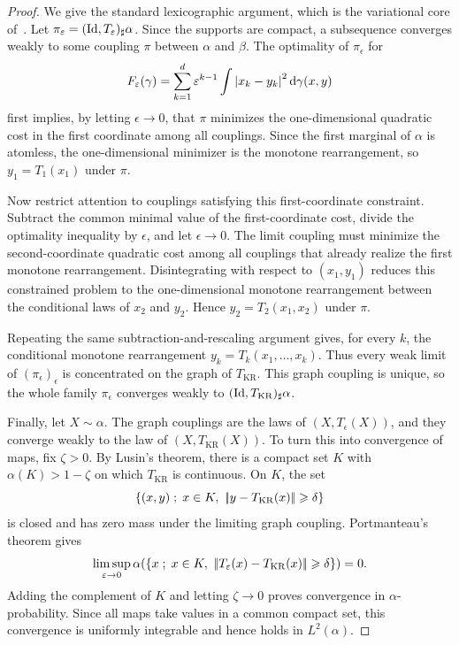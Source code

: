 \begin{proof}
	We give the standard lexicographic argument, which is the variational core of~\cite{carlier2010knothe}. Let $\pi_\varepsilon=(\mathrm{Id},T_\varepsilon)_\sharp\alpha$. Since the supports are compact, a subsequence converges weakly to some coupling $\pi$ between $\alpha$ and $\beta$. The optimality of $\pi_\epsilon$ for
	\[
		F_\varepsilon(\gamma)
		=
		\sum_{k=1}^d \varepsilon^{k-1}
		\int\left\lvert x_k-y_k\right\rvert^2\mathrm{d}\gamma(x,y)
	\]
	first implies, by letting $\epsilon\to0$, that $\pi$ minimizes the one-dimensional quadratic cost in the first coordinate among all couplings. Since the first marginal of $\alpha$ is atomless, the one-dimensional minimizer is the monotone rearrangement, so $y_1=T_1(x_1)$ under $\pi$.

	Now restrict attention to couplings satisfying this first-coordinate constraint. Subtract the common minimal value of the first-coordinate cost, divide the optimality inequality by $\epsilon$, and let $\epsilon\to0$. The limit coupling must minimize the second-coordinate quadratic cost among all couplings that already realize the first monotone rearrangement. Disintegrating with respect to $(x_1,y_1)$ reduces this constrained problem to the one-dimensional monotone rearrangement between the conditional laws of $x_2$ and $y_2$. Hence $y_2=T_2(x_1,x_2)$ under $\pi$.

	Repeating the same subtraction-and-rescaling argument gives, for every $k$, the conditional monotone rearrangement $y_k=T_k(x_1,\ldots,x_k)$. Thus every weak limit of $(\pi_\epsilon)_\epsilon$ is concentrated on the graph of $T_{\mathrm{KR}}$. This graph coupling is unique, so the whole family $\pi_\epsilon$ converges weakly to $(\mathrm{Id},T_{\mathrm{KR}})_\sharp\alpha$.

	Finally, let $X\sim\alpha$. The graph couplings are the laws of $(X,T_\epsilon(X))$, and they converge weakly to the law of $(X,T_{\mathrm{KR}}(X))$. To turn this into convergence of maps, fix $\zeta>0$. By Lusin's theorem, there is a compact set $K$ with $\alpha(K)>1-\zeta$ on which $T_{\mathrm{KR}}$ is continuous. On $K$, the set
	\[
		\enscond{(x,y)}{x\in K,\ \norm{y-T_{\mathrm{KR}}(x)}\geq\delta}
	\]
	is closed and has zero mass under the limiting graph coupling. Portmanteau's theorem gives
	\[
		\limsup_{\epsilon\to0}
		\alpha\!\left(\enscond{x}{x\in K,\ \norm{T_\epsilon(x)-T_{\mathrm{KR}}(x)}\geq\delta}\right)
		=0 .
	\]
	Adding the complement of $K$ and letting $\zeta\to0$ proves convergence in $\alpha$-probability. Since all maps take values in a common compact set, this convergence is uniformly integrable and hence holds in $L^2(\alpha)$.
\end{proof}

